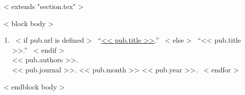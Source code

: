 ~< extends "section.tex" >~

~< block body >~
  \begin{enumerate}
    \itemsep 1em
    ~< for pub in items >~
      \item{
        ~< if pub.url is defined >~
          ``\href{<< pub.url >>}{<< pub.title >>}.''
        ~< else >~
          ``<< pub.title >>.''
        ~< endif >~\\
        << pub.authors >>.\\
        << pub.journal >>.
        << pub.month >>
        << pub.year >>.
      }
    ~< endfor >~
  \end{enumerate}
~< endblock body >~
